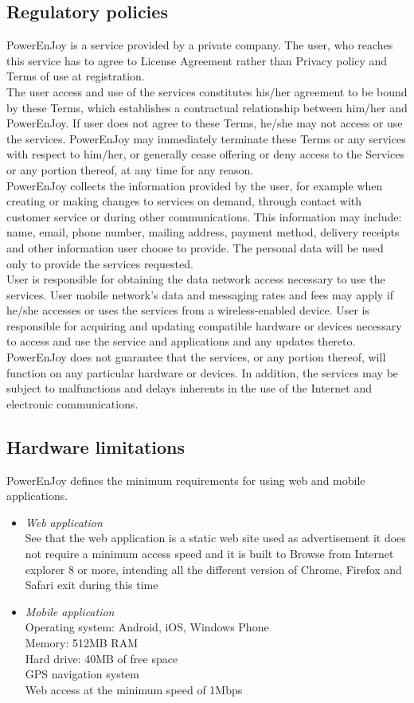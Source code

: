 \subsection{Regulatory policies}
PowerEnJoy is a service provided by a private company. The user, who reaches this service has to agree to License Agreement rather than Privacy policy and Terms of use at registration.\\
The user access and use of the services constitutes his/her agreement to be bound by these Terms, which establishes a contractual relationship between him/her and PowerEnJoy. If user does not agree to these Terms, he/she may not access or use the services. PowerEnJoy may immediately terminate these Terms or any services with respect to him/her, or generally cease offering or deny access to the Services or any portion thereof, at any time for any reason.\\
PowerEnJoy collects the information provided by the user, for example when creating or making changes to services on demand, through contact with customer service or during other communications. This information may include: name, email, phone number, mailing address, payment method, delivery receipts and other information user choose to provide. The personal data will be used only to provide the services requested.\\
User is responsible for obtaining the data network access necessary to use the services. User mobile network's data and messaging rates and fees may apply if he/she accesses or uses the services from a wireless-enabled device. User is responsible for acquiring and updating compatible hardware or devices necessary to access and use the service and applications and any updates thereto.\\
PowerEnJoy does not guarantee that the services, or any portion thereof, will function on any particular hardware or devices. In addition, the services may be subject to malfunctions and delays inherents in the use of the Internet and electronic communications.

\subsection{Hardware limitations}
PowerEnJoy defines the minimum requirements for using web and mobile applications.
\begin{itemize}
	\item \textit{Web application}\\
	See that the web application is a static web site used as advertisement it does not require a minimum access speed and it is built to Browse from Internet explorer 8 or more, intending all the different version of Chrome, Firefox and Safari exit during this time
	\item \textit{Mobile application}\\
	Operating system: Android, iOS, Windows Phone\\
	Memory: 512MB RAM\\
	Hard drive: 40MB of free space\\
	GPS navigation system\\
	Web access at the minimum speed of 1Mbps
\end{itemize}

